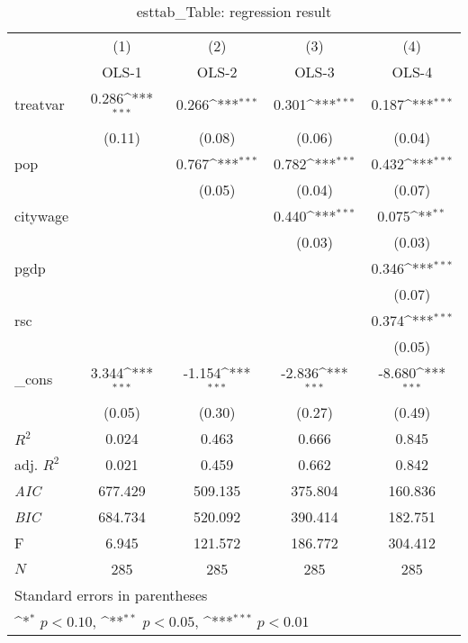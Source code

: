 \documentclass{article}
\begin{document}
\begin{table}[htbp]\centering
\def\sym#1{\ifmmode^{#1}\else\(^{#1}\)\fi}
\caption{esttab\_Table: regression result}
\begin{tabular*}{\hsize}{@{\hskip\tabcolsep\extracolsep\fill}l*{4}{c}}
\toprule
          &\multicolumn{1}{c}{(1)}&\multicolumn{1}{c}{(2)}&\multicolumn{1}{c}{(3)}&\multicolumn{1}{c}{(4)}\\
          &\multicolumn{1}{c}{OLS-1}&\multicolumn{1}{c}{OLS-2}&\multicolumn{1}{c}{OLS-3}&\multicolumn{1}{c}{OLS-4}\\
\midrule
treatvar  &    0.286\sym{***}&    0.266\sym{***}&    0.301\sym{***}&    0.187\sym{***}\\
          &   (0.11)         &   (0.08)         &   (0.06)         &   (0.04)         \\
pop       &                  &    0.767\sym{***}&    0.782\sym{***}&    0.432\sym{***}\\
          &                  &   (0.05)         &   (0.04)         &   (0.07)         \\
citywage  &                  &                  &    0.440\sym{***}&    0.075\sym{**} \\
          &                  &                  &   (0.03)         &   (0.03)         \\
pgdp      &                  &                  &                  &    0.346\sym{***}\\
          &                  &                  &                  &   (0.07)         \\
rsc       &                  &                  &                  &    0.374\sym{***}\\
          &                  &                  &                  &   (0.05)         \\
\_cons    &    3.344\sym{***}&   -1.154\sym{***}&   -2.836\sym{***}&   -8.680\sym{***}\\
          &   (0.05)         &   (0.30)         &   (0.27)         &   (0.49)         \\
\midrule
\(R^{2}\) &    0.024         &    0.463         &    0.666         &    0.845         \\
adj. \(R^{2}\)&    0.021         &    0.459         &    0.662         &    0.842         \\
\textit{AIC}&  677.429         &  509.135         &  375.804         &  160.836         \\
\textit{BIC}&  684.734         &  520.092         &  390.414         &  182.751         \\
F         &    6.945         &  121.572         &  186.772         &  304.412         \\
\(N\)     &      285         &      285         &      285         &      285         \\
\bottomrule
\multicolumn{5}{l}{\footnotesize Standard errors in parentheses}\\
\multicolumn{5}{l}{\footnotesize \sym{*} \(p<0.10\), \sym{**} \(p<0.05\), \sym{***} \(p<0.01\)}\\
\end{tabular*}
\end{table}
\end{document}
